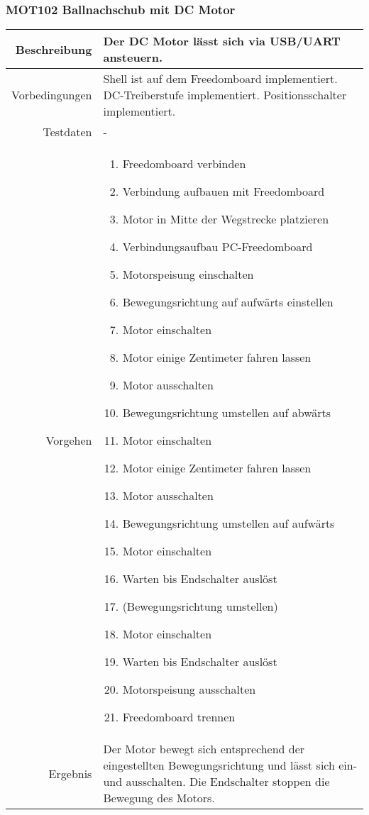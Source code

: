 \newpage
\subsubsection{MOT102 Ballnachschub mit DC Motor}
\begin{table}[h!]
	\renewcommand{\arraystretch}{1.5}
	\begin{tabular}{|r|p{13cm}|}
		\hline Beschreibung	& Der DC Motor lässt sich via USB/UART ansteuern. \\ 
		\hline Vorbedingungen	&
			Shell ist auf dem Freedomboard implementiert.
			DC-Treiberstufe implementiert. Positionsschalter implementiert. \\ 
		\hline Testdaten	& - \\ 
		\hline Vorgehen		& 
		\begin{enumerate}
			\item Freedomboard verbinden
			\item Verbindung aufbauen mit Freedomboard
			\item Motor in Mitte der Wegstrecke platzieren 
			\item Verbindungsaufbau PC-Freedomboard
			\item Motorspeisung einschalten
			\item Bewegungsrichtung auf aufwärts einstellen
			\item Motor einschalten
			\item Motor einige Zentimeter fahren lassen
			\item Motor ausschalten
			\item Bewegungsrichtung umstellen auf abwärts
			\item Motor einschalten
			\item Motor einige Zentimeter fahren lassen
			\item Motor ausschalten
			\item Bewegungsrichtung umstellen auf aufwärts
			\item Motor einschalten
			\item Warten bis Endschalter auslöst
			\item (Bewegungsrichtung umstellen)
			\item Motor einschalten
			\item Warten bis Endschalter auslöst
			\item Motorspeisung ausschalten
			\item Freedomboard trennen
		\end{enumerate} \\ 
		\hline Ergebnis 	&
			Der Motor bewegt sich entsprechend der eingestellten
			Bewegungsrichtung und lässt sich ein- und ausschalten.
			Die Endschalter stoppen die Bewegung des Motors. \\ 
		\hline 
	\end{tabular}
\end{table}

